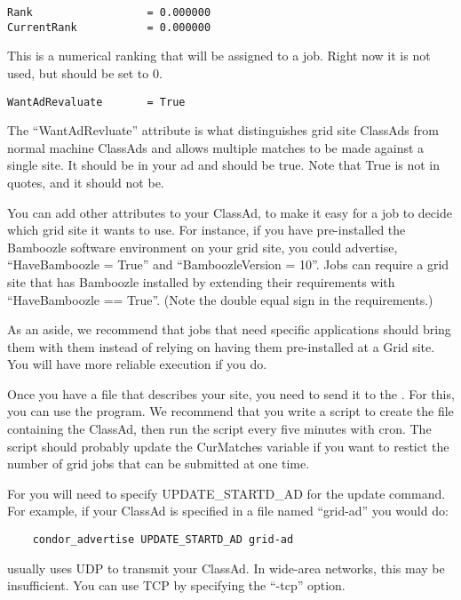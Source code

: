 \begin{verbatim}
Rank                  = 0.000000
CurrentRank           = 0.000000
\end{verbatim}

This is a numerical ranking that will be assigned to a job. Right now
it is not used, but should be set to 0. 

\begin{verbatim}
WantAdRevaluate       = True
\end{verbatim}

The ``WantAdRevluate'' attribute is what distinguishes grid site
ClassAds from normal machine ClassAds and allows multiple matches to
be made against a single site. It should be in your ad and should be
true. Note that True is not in quotes, and it should not be.

You can add other attributes to your ClassAd, to make it easy for a
job to decide which grid site it wants to use. For instance, if you
have pre-installed the Bamboozle software environment on your grid
site, you could advertise, ``HaveBamboozle = True'' and
``BamboozleVersion = 10''. Jobs can require a grid site that has
Bamboozle installed by extending their requirements with
``HaveBamboozle == True''. (Note the double equal sign in the
requirements.) 

As an aside, we recommend that jobs that need specific applications
should bring them with them instead of relying on having them
pre-installed at a Grid site. You will have more reliable execution if
you do. 

Once you have a file that describes your site, you need to send it to
the . For this, you can use the 
program. We recommend that you write a script to create the file
containing the ClassAd, then run the script every five minutes with
cron. The script should probably update the CurMatches variable if you
want to restict the number of grid jobs that can be submitted at one
time. 

For  you will need to specify UPDATE\_STARTD\_AD for
the update command. For example, if your ClassAd is specified in a
file named ``grid-ad'' you would do:

\begin{verbatim}
    condor_advertise UPDATE_STARTD_AD grid-ad
\end{verbatim}

 usually uses UDP to transmit your ClassAd. In
wide-area networks, this may be insufficient. You can use TCP by
specifying the ``-tcp'' option. 

